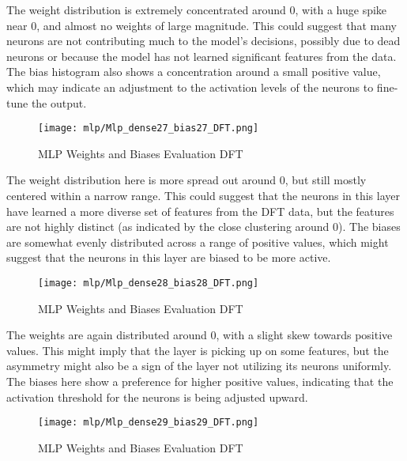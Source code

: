 The weight distribution is extremely concentrated around 0, with a huge spike near 0, and almost no weights of large magnitude. This could suggest that many neurons are not contributing much to the model's decisions, possibly due to dead neurons or because the model has not learned significant features from the data. The bias histogram also shows a concentration around a small positive value, which may indicate an adjustment to the activation levels of the neurons to fine-tune the output.

\begin{figure}[H] 
  \centering
  \texttt{[image: mlp/Mlp\_dense27\_bias27\_DFT.png]}
  \caption{MLP Weights and Biases Evaluation DFT}\label{fig:Mlp_dense27_bias27_DFTMlp_dense27_bias27_DFT}
\end{figure}

The weight distribution here is more spread out around 0, but still mostly centered within a narrow range. This could suggest that the neurons in this layer have learned a more diverse set of features from the DFT data, but the features are not highly distinct (as indicated by the close clustering around 0). The biases are somewhat evenly distributed across a range of positive values, which might suggest that the neurons in this layer are biased to be more active.


\begin{figure}[H] 
  \centering
  \texttt{[image: mlp/Mlp\_dense28\_bias28\_DFT.png]}
  \caption{MLP Weights and Biases Evaluation DFT}\label{fig:Mlp_dense28_bias28_DFT}
\end{figure}

The weights are again distributed around 0, with a slight skew towards positive values. This might imply that the layer is picking up on some features, but the asymmetry might also be a sign of the layer not utilizing its neurons uniformly. The biases here show a preference for higher positive values, indicating that the activation threshold for the neurons is being adjusted upward.

\begin{figure}[H] 
  \centering
  \texttt{[image: mlp/Mlp\_dense29\_bias29\_DFT.png]}
  \caption{MLP Weights and Biases Evaluation DFT}\label{fig:Mlp_dense29_bias29_DFT}
\end{figure}

